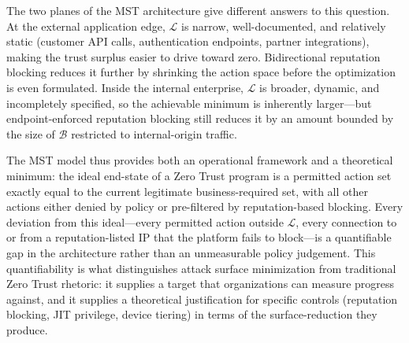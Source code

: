 \documentclass[unnumsec,webpdf,contemporary,large]{oup-authoring-template}
\theoremstyle{thmstyleone}
\theoremstyle{thmstyletwo}
\theoremstyle{thmstylethree}
\begin{document}
\begin{appendices}
The two planes of the MST architecture give different answers to this question.
At the external application edge, $\mathcal{L}$ is narrow, well-documented, and
relatively static (customer API calls, authentication endpoints, partner integrations),
making the trust surplus easier to drive toward zero. Bidirectional reputation
blocking reduces it further by shrinking the action space before the optimization
is even formulated. Inside the internal enterprise, $\mathcal{L}$ is broader,
dynamic, and incompletely specified, so the achievable minimum is inherently
larger---but endpoint-enforced reputation blocking still reduces it by an amount
bounded by the size of $\mathcal{B}$ restricted to internal-origin traffic.

The MST model thus provides both an operational framework and a theoretical
minimum: the ideal end-state of a Zero Trust program is a permitted action set
exactly equal to the current legitimate business-required set, with all other
actions either denied by policy or pre-filtered by reputation-based blocking.
Every deviation from this ideal---every permitted action outside $\mathcal{L}$,
every connection to or from a reputation-listed IP that the platform fails to
block---is a quantifiable gap in the architecture rather than an unmeasurable
policy judgement. This quantifiability is what distinguishes attack surface
minimization from traditional Zero Trust rhetoric: it supplies a target that
organizations can measure progress against, and it supplies a theoretical
justification for specific controls (reputation blocking, JIT privilege,
device tiering) in terms of the surface-reduction they produce.

\end{appendices}
\end{document}
